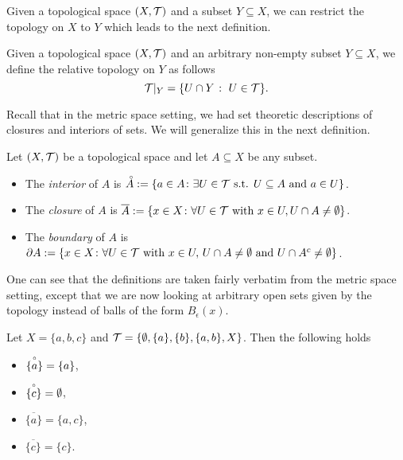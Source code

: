 \documentclass{article}
\begin{document}
Given a topological space $(X,\mathcal{T})$ and a subset $Y\subseteq X$, we can restrict the topology on $X$ to $Y$ which leads to the next definition. 

\begin{definition}
Given a topological space $(X,\mathcal{T})$ and an arbitrary non-empty subset $Y \subseteq X$, we define the relative topology on $Y$ as follows
\begin{equation*}
    \mathcal{T}\vert_Y = \{U\cap Y \; \colon\; U \in \mathcal{T}\}.
\end{equation*}
\end{definition}

Recall that in the metric space setting, we had set theoretic descriptions of closures and interiors of sets. We will generalize this in the next definition. 

\begin{definition}
Let $(X,\mathcal{T})$ be a topological space and let $A\subseteq X$ be any subset.
\begin{itemize}
    \item The \emph{interior} of $A$ is $\accentset{\circ} A := \{a \in A \colon \exists U \in  \mathcal{T} \text{ s.t. } U\subseteq A \text{ and } a\in U\} $.
    \item The \emph{closure} of $A$ is $\overline{A} := \{x \in X \colon \forall U \in \mathcal{T} \text{ with } x \in U, U\cap A \neq \emptyset\}$.
    \item The \emph{boundary} of $A$ is $\partial A:= \{x \in X \colon \forall U\in \mathcal{T} \text{ with } x\in U, \, U \cap A \neq \emptyset \text{ and } U \cap A^c \neq \emptyset \}$.
\end{itemize}
\end{definition}
One can see that the definitions are taken fairly verbatim from the metric space setting, except that we are now looking at arbitrary open sets given by the topology instead of balls of the form $B_\epsilon(x)$.  

\begin{example}
Let $X=\{a,b,c\}$ and $\mathcal{T} = \{\emptyset ,\{a\}, \{b\},\{a,b\}, X\}$. Then the following holds
\begin{itemize}
    \item $ \accentset{\circ}{\{ a\} }= \{a\}$,
    \item $\accentset{\circ}{ \{c\}} = \emptyset$,
    \item $\overline{\{a\}} = \{a,c\}$,
    \item $\overline{\{c\}} = \{c\}$.
\end{itemize}
\end{example}
\end{document}
